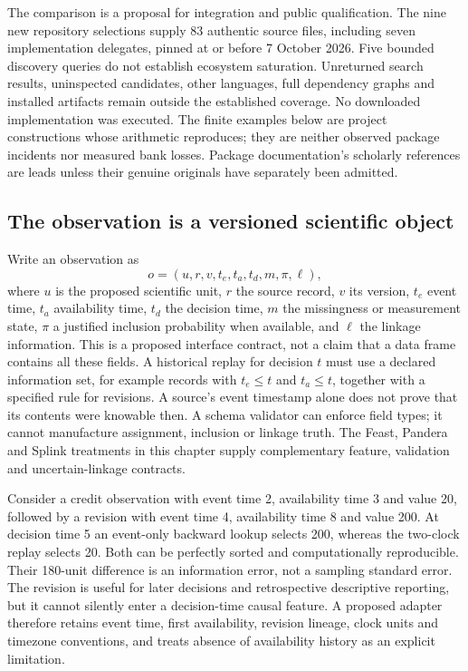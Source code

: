 The comparison is a proposal for integration and public qualification. The nine new repository selections supply 83 authentic source files, including seven implementation delegates, pinned at or before 7 October 2026. Five bounded discovery queries do not establish ecosystem saturation. Unreturned search results, uninspected candidates, other languages, full dependency graphs and installed artifacts remain outside the established coverage. No downloaded implementation was executed. The finite examples below are project constructions whose arithmetic reproduces; they are neither observed package incidents nor measured bank losses. Package documentation's scholarly references are leads unless their genuine originals have separately been admitted.~\citep{exec25_dww_choice}

\subsection{The observation is a versioned scientific object}

Write an observation as
\[
 o=(u,r,v,t_e,t_a,t_d,m,\pi,\ell),
\]
where $u$ is the proposed scientific unit, $r$ the source record, $v$ its version, $t_e$ event time, $t_a$ availability time, $t_d$ the decision time, $m$ the missingness or measurement state, $\pi$ a justified inclusion probability when available, and $\ell$ the linkage information. This is a proposed interface contract, not a claim that a data frame contains all these fields. A historical replay for decision $t$ must use a declared information set, for example records with $t_e\leq t$ and $t_a\leq t$, together with a specified rule for revisions. A source's event timestamp alone does not prove that its contents were knowable then. A schema validator can enforce field types; it cannot manufacture assignment, inclusion or linkage truth. The Feast, Pandera and Splink treatments in this chapter supply complementary feature, validation and uncertain-linkage contracts.~\citep{exec19_feast_source,exec19_feast_reference,exec24_pandera_source,exec24_pandera_reference,exec24_splink_sources,exec24_splink_contract,exec25_dww_choice}

Consider a credit observation with event time 2, availability time 3 and value 20, followed by a revision with event time 4, availability time 8 and value 200. At decision time 5 an event-only backward lookup selects 200, whereas the two-clock replay selects 20. Both can be perfectly sorted and computationally reproducible. Their 180-unit difference is an information error, not a sampling standard error. The revision is useful for later decisions and retrospective descriptive reporting, but it cannot silently enter a decision-time causal feature. A proposed adapter therefore retains event time, first availability, revision lineage, clock units and timezone conventions, and treats absence of availability history as an explicit limitation.~\citep{exec25_dww_choice}


